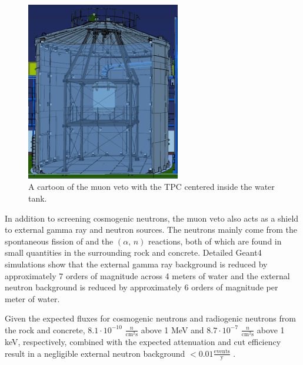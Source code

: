  
 \begin{figure}[t]
	\centering
	\includegraphics[width=0.6\textwidth]{cartoon_full_water_tank_muon_veto}
	\caption{A cartoon of the muon veto with the TPC centered inside the water tank.}
	\label{fig:cartoon_water_tank}
\end{figure}
 
 In addition to screening cosmogenic neutrons, the muon veto also acts as a shield to external gamma ray and neutron sources.  The neutrons mainly come from the spontaneous fission of  and the  $(\alpha, \, n)$ reactions, both of which are found in small quantities in the surrounding rock and concrete.  Detailed Geant4 simulations \cite{agostinelli2003geant4} show that the external gamma ray background is reduced by approximately 7 orders of magnitude across 4 meters of water and the external neutron background is reduced by approximately 6 orders of magnitude per meter of water.  
 
 Given the expected fluxes for cosmogenic neutrons and radiogenic neutrons from the rock and concrete, $8.1 \cdot 10^{-10}$ $\frac{n}{\textrm{cm}^2 \textrm{s}}$ above 1 MeV \cite{mei2006muon} and $8.7 \cdot 10^{-7}$ $\frac{n}{\textrm{cm}^2 \textrm{s}}$ above 1 keV, respectively, combined with the expected attenuation and cut efficiency result in a negligible external neutron background $< 0.01 \frac{\textrm{events}}{\textrm{y}}$ \cite{aprile2016physics}.
 
